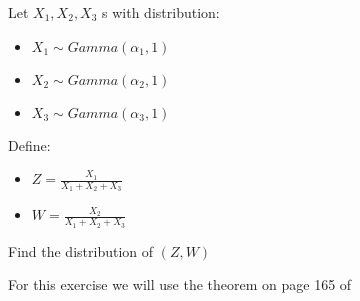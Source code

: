 \begin{ex}
	Let $X_1,X_2,X_3$ \rv s with distribution:
	\begin{itemize}
		\item $X_1 \sim Gamma (\alpha_1,1)$
		\item $X_2 \sim Gamma (\alpha_2,1)$
		\item $X_3 \sim Gamma (\alpha_3,1)$
	\end{itemize}
	Define:
	\begin{itemize}
		\item $Z=\frac{X_1}{X_1+X_2+X_3}$
		\item $W=\frac{X_2}{X_1+X_2+X_3}$
	\end{itemize}
	Find the distribution of $(Z,W)$



For this exercise we will use the theorem on page 165 of \cite{Casella}


\iffalse
For this exercise we will use the following theorem:

\begin{teo}
	Let $n\leq N$ positive integers, $C \subset \mathbb{R}^{n}$ a compact, $\phi:C\to \mathbb{R}^N$ a $(n,N)$ regular parametrization and $f:\phi (C)\to \mathbb{R}$ a continuous function, then:
	$$\int_{\phi(C)} f d\mathcal{H}^n= \int_{C}(f \circ \phi) J_{\phi}d \mathcal{L}^n$$
	Where
	$$J_{\phi}:=(det[D_{\phi}^T \times D_{\phi}])^{1/2}\not = 0$$
\end{teo}
${H}^n$ and $\mathcal{L}^n$ indicates the Hausdorff and Lebesgue function and
\[
D_{\phi}=\begin{bmatrix}
\frac{\partial \phi_1}{\partial x_1} & \dots  & \frac{\partial \phi_1}{\partial x_n} \\
\vdots &  \ddots & \vdots \\
\frac{\partial \phi_N}{\partial x_1} &  \dots  & \frac{\partial \phi_N}{\partial x_n}
\end{bmatrix}	
\]
$$\phi (W,Z,S)=(ZS,WS,S-S(Z+W))$$

\fi


\end{ex}
